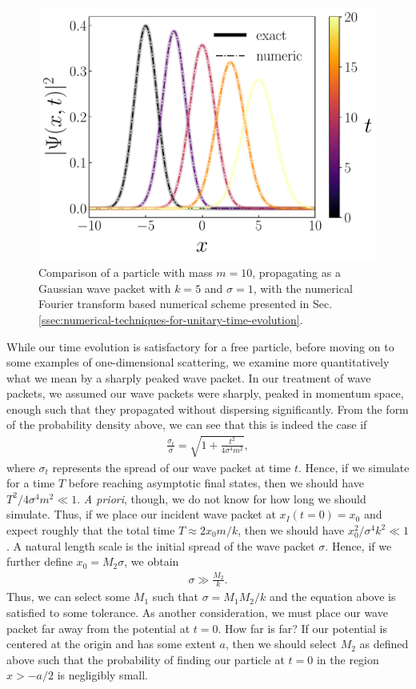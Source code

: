 \begin{figure}[tb]
    \centering
    \includegraphics[width=0.7\linewidth]{gauss_wave-prop.pdf}
    \caption{Comparison of a particle with mass $m = 10$, propagating as a Gaussian wave packet with $k = 5$ and $\sigma = 1$, with the numerical Fourier transform based numerical scheme presented in Sec. \ref{ssec:numerical-techniques-for-unitary-time-evolution}.}
    \label{fig:gauss-wave-prop}
\end{figure}

While our time evolution is satisfactory for a free particle, before moving on to some examples of one-dimensional scattering, we examine more quantitatively what we mean by a sharply peaked wave packet.
In our treatment of wave packets, we assumed our wave packets were sharply, peaked in momentum space, enough such that they propagated without dispersing significantly.
From the form of the probability density above, we can see that this is indeed the case if
\begin{align}
    \frac{\sigma_{t}}{\sigma} = \sqrt{1 + \frac{t^2}{4 \sigma^{4} m^2}}
,\end{align}
where $\sigma_{t}$ represents the spread of our wave packet at time $t$.
Hence, if we simulate for a time $T$ before reaching asymptotic final states, then we should have $T^2 / 4 \sigma^{4} m^2 \ll 1$.
\textit{A priori}, though, we do not know for how long we should simulate.
Thus, if we place our incident wave packet at $x_{I}(t = 0) = x_0$ and expect roughly that the total time $T \approx 2 x_0 m / k$, then we should have $x_0^2 / \sigma^{4} k^2 \ll 1$.
A natural length scale is the initial spread of the wave packet $\sigma$.
Hence, if we further define $x_0 = M_2 \sigma$, we obtain
\begin{align}
    \sigma \gg \frac{M_2}{k}
.\end{align}
Thus, we can select some $M_1$ such that $\sigma = M_1 M_2 / k$ and the equation above is satisfied to some tolerance.
As another consideration, we must place our wave packet far away from the potential at $t = 0$.
How far is far?
If our potential is centered at the origin and has some extent $a$, then we should select $M_2$ as defined above such that the probability of finding our particle at $t = 0$ in the region $x > -a/2$ is negligibly small.

